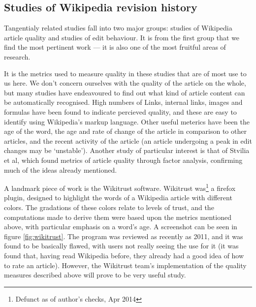 
\subsection*{Studies of Wikipedia revision history}
Tangentialy related studies fall into two major groups: studies of
Wikipedia article quality and studies of edit behaviour.  It is from
the first group that we find the most pertinent work --- it is also
one of the most fruitful areas of research.

It is the metrics used to measure quality in these studies that are of
most use to us here. We don't concern ourselves with the quality of
the article on the whole, but many studies have endeavoured to find
out what kind of article content can be automatically recognised. High
numbers of Links, internal links, images and formulas have been found
to indicate percieved quality,\cite{Lucassen2010}\cite{mcguinness2006}
and these are easy to identify using Wikipedia's markup
language. Other useful meterics have been the age of the
word,\cite{Cross2006} the age and rate of change of the article in
comparison to other articles,\cite{Zeng2006} and the recent activity
of the article (an article undergoing a peak in edit changes may be
`unstable').\cite{Adler2006} Another study of particular interest is
that of Stvilia et al, which found metrics of article quality through
factor analysis,\cite{Stvilia2005} confirming much of the ideas
already mentioned.

A landmark piece of work is the Wikitrust software.\cite{Adler2007}
Wikitrust was\footnote{Defunct as of author's checks, Apr 2014} a
firefox plugin, designed to highlight the words of a Wikipedia article
with different colors. The gradations of these colors relate to levels
of trust, and the computations made to derive them were based upon the
metrics mentioned above, with particular emphasis on a word's age. A
screenshot can be seen in figure \ref{fig:wikitrust}. The program was
reviewed as recently as 2011,\cite{Lucassen2011} and it was found to
be basically flawed, with users not really seeing the use for it (it
was found that, having read Wikipedia before, they already had a good
idea of how to rate an article). However, the Wikitrust team's
implementation of the quality measures described above will prove to
be very useful study.

